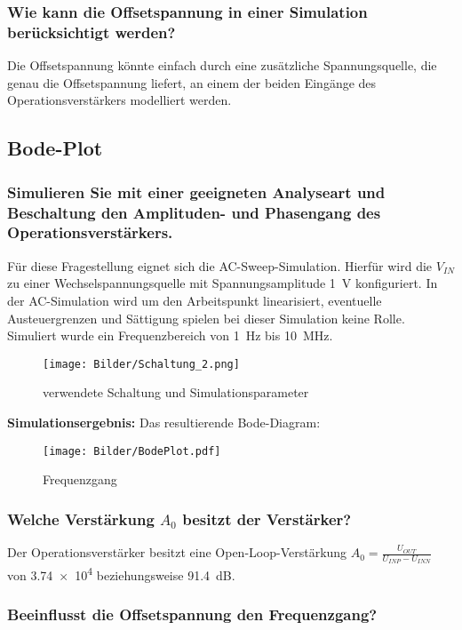 \subsubsection{Wie kann die Offsetspannung in einer Simulation berücksichtigt werden?}
Die Offsetspannung könnte einfach durch eine zusätzliche Spannungsquelle, die genau die Offsetspannung liefert, an einem der beiden Eingänge des Operationsverstärkers modelliert werden.

\subsection{Bode-Plot}
\subsubsection{Simulieren Sie mit einer geeigneten Analyseart und Beschaltung den Amplituden- und Phasengang des Operationsverstärkers.}

Für diese Fragestellung eignet sich die AC-Sweep-Simulation. Hierfür wird die $V_{IN}$ zu einer Wechselspannungsquelle mit Spannungsamplitude \SI{1}{\volt} konfiguriert. In der AC-Simulation wird um den Arbeitspunkt linearisiert, eventuelle Austeuergrenzen und Sättigung spielen bei dieser Simulation keine Rolle. Simuliert wurde ein Frequenzbereich von \SI{1}{Hz} bis \SI{10}{\mega \hertz}.

\begin{figure}[H]
    \centering
    \texttt{[image: Bilder/Schaltung\_2.png]}
    \caption{verwendete Schaltung und Simulationsparameter}
    \label{fig:my_label}
\end{figure}

\textbf{Simulationsergebnis:} Das resultierende Bode-Diagram:
\begin{figure}[H]
    \centering
    \texttt{[image: Bilder/BodePlot.pdf]}
    \caption{Frequenzgang}
    \label{fig:my_label}
\end{figure}

\subsubsection{Welche Verstärkung $A_0$ besitzt der Verstärker?}

Der Operationsverstärker besitzt eine Open-Loop-Verstärkung $A_0 = \frac{U_{OUT}}{U_{INP}-U_{INN}}$ von \num{3.74e4} beziehungsweise \SI{91.4}{dB}.

\subsubsection{Beeinflusst die Offsetspannung den Frequenzgang?}

